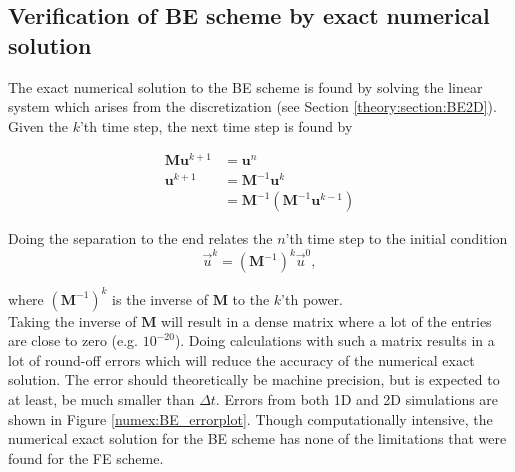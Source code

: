 \subsection{Verification of BE scheme by exact numerical solution}

The exact numerical solution to the BE scheme is found by solving the linear system which arises from the discretization (see Section \ref{theory:section:BE2D}). 
Given the $k$'th time step, the next time step is found by

\begin{align*}
 \mathbf M \mathbf u^{k+1} &= \mathbf{u}^n \\
 \mathbf{u}^{k+1} &= \mathbf{M}^{-1} \mathbf{u}^k \\
 &= \mathbf{M}^{-1}\left(\mathbf{M}^{-1} \mathbf{u}^{k-1}\right)
\end{align*}

\noindent Doing the separation to the end relates the $n$'th time step to the initial condition
\begin{equation}\label{BE_numex}
 \vec u^{k} = \left(\mathbf M^{-1}\right)^{k} \vec u^0,
\end{equation}

\noindent where $\left(\mathbf M^{-1}\right)^{k}$ is the inverse of $\mathbf M$ to the $k$'th power.\\

\noindent Taking the inverse of $\mathbf M$ will result in a dense matrix where a lot of the entries are close to zero (e.g. $10^{-20}$). 
Doing calculations with such a matrix results in a lot of round-off errors which will reduce the accuracy of the numerical exact solution. 
The error should theoretically be machine precision, but is expected to at least, be much smaller than $\Delta t$. 
Errors from both 1D and 2D simulations are shown in Figure \ref{numex:BE_errorplot}. 
Though computationally intensive, the numerical exact solution for the BE scheme has none of the limitations that were found for the FE scheme. 

